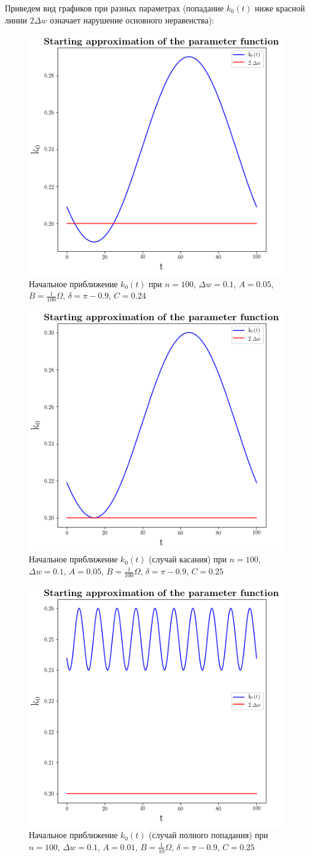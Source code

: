 \documentclass[12pt]{article}
\begin{document}
Приведем вид графиков при разных параметрах (попадание $k_0(t)$ ниже красной линии $2\Delta w$ означает нарушение основного неравенства):
\begin{figure}[H]
	\centering\includegraphics[width=0.6\columnwidth]{im1.png}\caption{Начальное приближение $k_0(t)$ при $n=100$, $\Delta w=0.1$, $A=0.05$, $B=\frac{1}{100}\Omega$, $\delta = \pi - 0.9$, $C=0.24$ }
\end{figure}
\begin{figure}[H]
	\centering\includegraphics[width=0.6\columnwidth]{im2.png}\caption{Начальное приближение $k_0(t)$ (случай касания) при $n=100$, $\Delta w=0.1$, $A=0.05$, $B=\frac{1}{100}\Omega$, $\delta = \pi - 0.9$, $C=0.25$ }
\end{figure}
\begin{figure}[H]
	\centering\includegraphics[width=0.6\columnwidth]{im3.png}\caption{Начальное приближение $k_0(t)$ (случай полного попадания) при $n=100$, $\Delta w=0.1$, $A=0.01$, $B=\frac{1}{10}\Omega$, $\delta = \pi - 0.9$, $C=0.25$ }
\end{figure}
\end{document}

